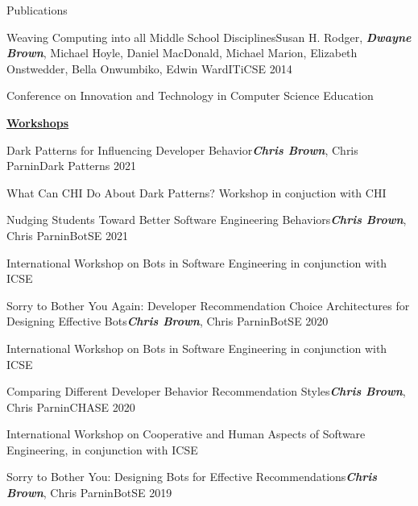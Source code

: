 \documentclass{resume} %
\begin{document}
\begin{rSection}{Publications}

\begin{pSubsection}{Weaving Computing into all Middle School Disciplines}{}{Susan H. Rodger, \textit{\textbf{Dwayne Brown}}, Michael Hoyle, Daniel MacDonald, Michael Marion, Elizabeth Onstwedder, Bella Onwumbiko, Edwin Ward}{ITiCSE 2014}
\item Conference on Innovation and Technology in Computer Science Education
\end{pSubsection}

\textbf{\underline{Workshops}}

\begin{pSubsection}{Dark Patterns for Influencing Developer Behavior}{}{\textit{\textbf{Chris Brown}}, Chris Parnin}{Dark Patterns 2021}
\item What Can CHI Do About Dark Patterns? Workshop in conjuction with CHI
\end{pSubsection}
\begin{pSubsection}{Nudging Students Toward Better Software Engineering Behaviors}{}{\textit{\textbf{Chris Brown}}, Chris Parnin}{BotSE 2021}
\item International Workshop on Bots in Software Engineering in conjunction with ICSE
\end{pSubsection}
\begin{pSubsection}{Sorry to Bother You Again: Developer Recommendation Choice Architectures for Designing Effective Bots}{}{\textit{\textbf{Chris Brown}}, Chris Parnin}{BotSE 2020}
\item International Workshop on
Bots in Software Engineering in conjunction with ICSE
\end{pSubsection}
\begin{pSubsection}{Comparing Different Developer Behavior Recommendation Styles}{}{\textit{\textbf{Chris Brown}}, Chris Parnin}{CHASE 2020}
\item International Workshop on Cooperative and Human Aspects of Software Engineering, in conjunction with ICSE
\end{pSubsection} 
\begin{pSubsection}{Sorry to Bother You: Designing Bots for Effective Recommendations}{}{\textit{\textbf{Chris Brown}}, Chris Parnin}{BotSE 2019}

\end{pSubsection}
\end{rSection}
\end{document}
